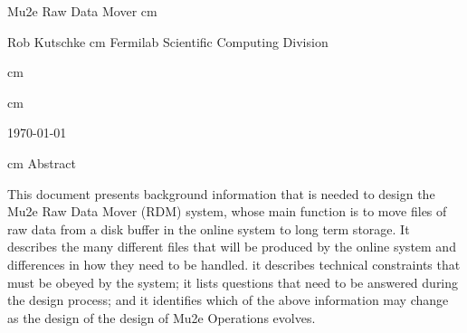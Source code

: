 %
\begin{center}
  {\Huge Mu2e Raw Data Mover}
   cm

  Rob Kutschke
 cm
Fermilab Scientific Computing Division

 cm


%

%

 cm

\today

 cm
Abstract
\end{center}
\medskip

This document presents background information
that is needed to design the Mu2e Raw Data Mover (RDM) system,
whose main function is to move files of raw data from a disk buffer
in the online system to long term storage.
It describes the many different files that will be produced by the online system
and differences in how they need to be handled.
it describes technical constraints that must be obeyed by the system;
it lists questions that need to be answered during the design process;
and it identifies which of the above information may change as the
design of the design of Mu2e Operations evolves.
\cleardoublepage
